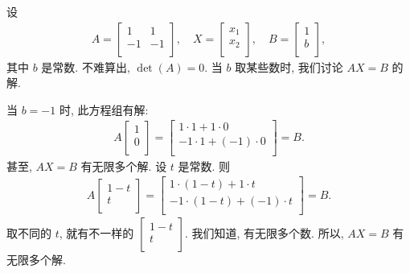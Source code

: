 \begin{example}
    设
    \begin{align*}
        A = \begin{bmatrix}
                1  & 1  \\
                -1 & -1 \\
            \end{bmatrix},
        \quad
        X =
        \begin{bmatrix}
            x_1 \\
            x_2 \\
        \end{bmatrix},
        \quad
        B =
        \begin{bmatrix}
            1 \\
            b \\
        \end{bmatrix},
    \end{align*}
    其中 \(b\) 是常数.
    不难算出, \(\det {(A)} = 0\).
    当 \(b\) 取某些数时,
    我们讨论 \(AX = B\) 的解.

    当 \(b = -1\) 时, 此方程组有解:
    \begin{align*}
        A
        \begin{bmatrix}
            1 \\
            0 \\
        \end{bmatrix}
        =
        \begin{bmatrix}
            1 \cdot 1 + 1 \cdot 0     \\
            -1 \cdot 1 + (-1) \cdot 0 \\
        \end{bmatrix}
        =
        B.
    \end{align*}
    甚至, \(AX = B\) 有无限多个解.
    设 \(t\) 是常数.
    则
    \begin{align*}
        A
        \begin{bmatrix}
            1 - t \\
            t     \\
        \end{bmatrix}
        =
        \begin{bmatrix}
            1 \cdot (1 - t) + 1 \cdot t     \\
            -1 \cdot (1 - t) + (-1) \cdot t \\
        \end{bmatrix}
        =
        B.
    \end{align*}
    取不同的 \(t\),
    就有不一样的
    \(
    \begin{bmatrix}
        1 - t \\
        t     \\
    \end{bmatrix}
    \).
    我们知道, 有无限多个数.
    所以, \(AX = B\) 有无限多个解.


\end{example}
